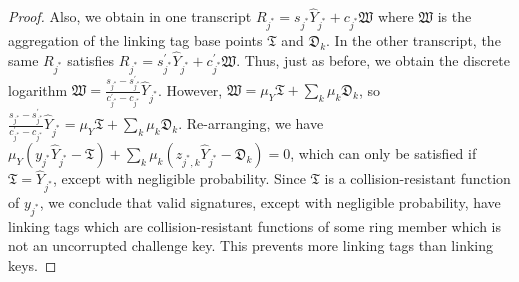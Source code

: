 \documentclass[11pt]{article}
\theoremstyle{definition}
\begin{document}
\begin{proof}
Also, we obtain in one transcript $R_{j^*} = s_{j^*} \widehat{Y}_{j^*} + c_{j^*} \mathfrak{W}$ where $\mathfrak{W}$ is the aggregation of the linking tag base points $\mathfrak{T}$ and $\mathfrak{D}_k$. In the other transcript, the same $R_{j^*}$ satisfies $R_{j^*} = s_{j^*}^\prime \widehat{Y}_{j^*} + c_{j^*}^\prime \mathfrak{W}$. Thus, just as before, we obtain the discrete logarithm $\mathfrak{W} = \frac{s_{j^*} - s_{j^*}^\prime}{c_{j^*}^\prime - c_{j^*}}\widehat{Y}_{j^*}$. However, $\mathfrak{W} = \mu_Y \mathfrak{T} + \sum_k \mu_k \mathfrak{D}_k$, so $\frac{s_{j^*} - s_{j^*}^\prime}{c_{j^*}^\prime - c_{j^*}}\widehat{Y}_{j^*} = \mu_Y \mathfrak{T} + \sum_k \mu_k \mathfrak{D}_k$.
Re-arranging, we have $\mu_Y\left(y_{j^*} \widehat{Y}_{j^*} - \mathfrak{T}\right) + \sum_k \mu_k\left(z_{j^*,k} \widehat{Y}_{j^*} - \mathfrak{D}_k\right) = 0$, which can only be satisfied if $\mathfrak{T} = \widehat{Y}_{j^*}$, except with negligible probability. 
Since $\mathfrak{T}$ is a collision-resistant function of $y_{j^*}$, we conclude that valid signatures, except with negligible probability, have linking tags which are collision-resistant functions of some ring member which is not an uncorrupted challenge key. This prevents more linking tags than linking keys.
\end{proof}








\end{document}
